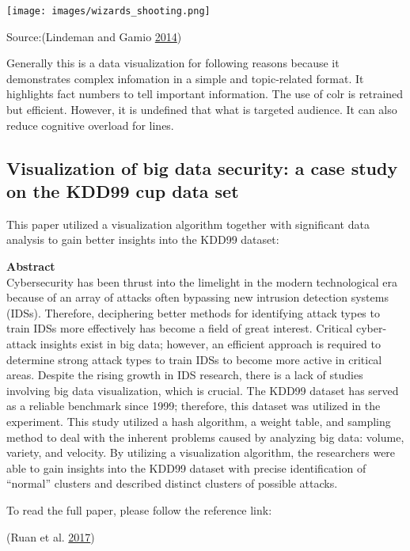 \documentclass[]{book}
\begin{document}
\texttt{[image: images/wizards\_shooting.png]}

Source:(Lindeman and Gamio \protect\hyperlink{ref-basketball}{2014})

Generally this is a data visualization for following reasons because it demonstrates complex infomation in a simple and topic-related format. It highlights fact numbers to tell important information. The use of colr is retrained but efficient. However, it is undefined that what is targeted audience. It can also reduce cognitive overload for lines.

\hypertarget{visualization-of-big-data-security-a-case-study-on-the-kdd99-cup-data-set}{%
\subsection{Visualization of big data security: a case study on the KDD99 cup data set}\label{visualization-of-big-data-security-a-case-study-on-the-kdd99-cup-data-set}}

This paper utilized a visualization algorithm together with significant data analysis to gain better insights into the KDD99 dataset:

\textbf{Abstract}\\
Cybersecurity has been thrust into the limelight in the modern technological era because of an array of attacks often bypassing new intrusion detection systems (IDSs). Therefore, deciphering better methods for identifying attack types to train IDSs more effectively has become a field of great interest. Critical cyber-attack insights exist in big data; however, an efficient approach is required to determine strong attack types to train IDSs to become more active in critical areas. Despite the rising growth in IDS research, there is a lack of studies involving big data visualization, which is crucial. The KDD99 dataset has served as a reliable benchmark since 1999; therefore, this dataset was utilized in the experiment. This study utilized a hash algorithm, a weight table, and sampling method to deal with the inherent problems caused by analyzing big data: volume, variety, and velocity. By utilizing a visualization algorithm, the researchers were able to gain insights into the KDD99 dataset with precise identification of ``normal'' clusters and described distinct clusters of possible attacks.

To read the full paper, please follow the reference link:

(Ruan et al. \protect\hyperlink{ref-gapminder}{2017})
\end{document}
